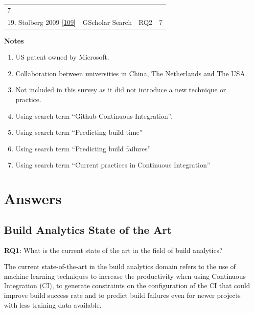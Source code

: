 \documentclass[]{book}
\providecommand{\tightlist}{%
  \setlength{\itemsep}{0pt}\setlength{\parskip}{0pt}}
\begin{document}
\begin{longtable}[]{@{}llll@{}}
\begin{minipage}[t]{0.06\columnwidth}
7\strut
\end{minipage}\tabularnewline
\begin{minipage}[t]{0.56\columnwidth}\raggedright\strut
19. Stolberg 2009
{[}\protect\hyperlink{ref-stolberg2009enabling}{109}{]}\strut
\end{minipage} & \begin{minipage}[t]{0.18\columnwidth}\raggedright\strut
GScholar Search\strut
\end{minipage} & \begin{minipage}[t]{0.08\columnwidth}\raggedright\strut
RQ2\strut
\end{minipage} & \begin{minipage}[t]{0.06\columnwidth}\raggedright\strut
7\strut
\end{minipage}\tabularnewline
\bottomrule
\end{longtable}

\textbf{Notes}

\begin{enumerate}
\def\labelenumi{\arabic{enumi}.}
\tightlist
\item
  US patent owned by Microsoft.
\item
  Collaboration between universities in China, The Netherlands and The
  USA.
\item
  Not included in this survey as it did not introduce a new technique or
  practice.
\item
  Using search term ``Github Continuous Integration''.
\item
  Using search term ``Predicting build time''
\item
  Using search term ``Predicting build failures''
\item
  Using search term ``Current practices in Continuous Integration''
\end{enumerate}

\section{Answers}\label{answers}

\subsection{Build Analytics State of the
Art}\label{build-analytics-state-of-the-art}

\textbf{RQ1}: What is the current state of the art in the field of build
analytics?

The current state-of-the-art in the build analytics domain refers to the
use of machine learning techniques to increase the productivity when
using Continuous Integration (CI), to generate constraints on the
configuration of the CI that could improve build success rate and to
predict build failures even for newer projects with less training data
available.
\end{document}
